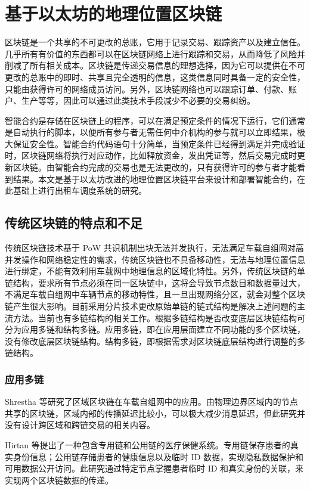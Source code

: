 \section{基于以太坊的地理位置区块链}
区块链是一个共享的不可更改的总账，它用于记录交易、跟踪资产以及建立信任。几乎所有有价值的东西都可以在区块链网络上进行跟踪和交易，从而降低了风险并削减了所有相关成本。区块链是传递交易信息的理想选择，因为它可以提供在不可更改的总账中的即时、共享且完全透明的信息，这类信息同时具备一定的安全性，只能由获得许可的网络成员访问。另外，区块链网络也可以跟踪订单、付款、账户、生产等等，因此可以通过此类技术手段减少不必要的交易纠纷。\par
智能合约是存储在区块链上的程序，可以在满足预定条件的情况下运行，它们通常是自动执行的脚本，以便所有参与者无需任何中介机构的参与就可以立即结果，极大保证安全性。智能合约代码语句十分简单，当预定条件已经得到满足并完成验证时，区块链网络将执行对应动作，比如释放资金，发出凭证等，然后交易完成时更新区块链。由智能合约完成的交易也是无法更改的，只有获得许可的参与者才能看到结果。本文是基于以太坊改进的地理位置区块链平台来设计和部署智能合约，在此基础上进行出租车调度系统的研究。

\subsection{传统区块链的特点和不足}
传统区块链技术基于 PoW 共识机制出块无法并发执行，无法满足车载自组网对高并发操作和网络稳定性的需求，传统区块链也不具备移动性，无法与地理位置信息进行绑定，不能有效利用车载网中地理信息的区域化特性。另外，传统区块链的单链结构，要求所有节点必须在同一区块链中，这将会导致节点数目和数据量过大，不满足车载自组网中车辆节点的移动特性，且一旦出现网络分区，就会对整个区块链产生很大影响。目前采用分片技术更改原始单链的链式结构是解决上述问题的主流方法。当前也有多链结构的相关工作。根据多链结构是否改变底层区块链结构可分为应用多链和结构多链。应用多链，即在应用层面建立不同功能的多个区块链，没有修改底层区块链结构。结构多链，即根据需求对区块链底层结构进行调整的多链结构。
\subsubsection{应用多链}
Shrestha 等研究了区域区块链在车载自组网中的应用。由物理边界区域内的节点共享的区块链，区域内部的传播延迟比较小，可以极大减少消息延迟，但此研究并没有设计跨区域和跨链交易的相关内容。\par
Hirtan 等提出了一种包含专用链和公用链的医疗保健系统。专用链保存患者的真实身份信息；公用链存储患者的健康信息以及临时 ID 数据，实现隐私数据保护和可用数据公开访问。此研究通过特定节点掌握患者临时 ID 和真实身份的关联，来实现两个区块链数据的传递。

